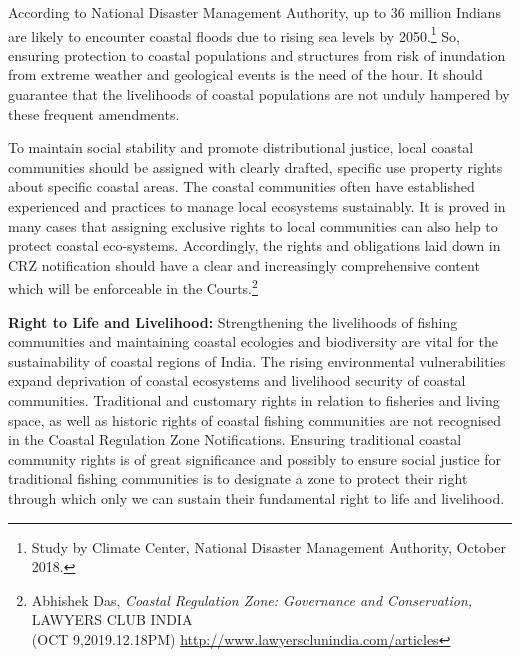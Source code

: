 \begin{multicols}{2}
\vspace{-.1cm}

\noi
According to National Disaster Management Authority, up to 36 million Indians are likely
to encounter coastal floods due to rising sea levels by 2050.\footnote{Study by Climate Center, National Disaster Management Authority, October 2018.} So, ensuring protection to
coastal populations and structures from risk of inundation from extreme weather and
geological events is the need of the hour. It should guarantee that the livelihoods of coastal
populations are not unduly hampered by these frequent amendments.

\noi
To maintain social stability and promote distributional justice, local coastal communities
should be assigned with clearly drafted, specific use property rights about specific coastal
areas. The coastal communities often have established experienced and practices to
manage local ecosystems sustainably. It is proved in many cases that assigning exclusive 
rights to local communities can also help to protect coastal eco-systems. Accordingly, the
rights and obligations laid down in CRZ notification should have a clear and increasingly
comprehensive content which will be enforceable in the Courts.\footnote{Abhishek Das, \textit{Coastal Regulation Zone: Governance and Conservation,} LAWYERS CLUB INDIA\\(OCT 9,2019.12.18PM) \url{http://www.lawyersclunindia.com/articles}}


\noi
{\large\bfseries Right to Life and Livelihood:} Strengthening the livelihoods of fishing
communities and maintaining coastal ecologies and biodiversity are vital for the
sustainability of coastal regions of India. The rising environmental vulnerabilities expand
deprivation of coastal ecosystems and livelihood security of coastal communities. Traditional
and customary rights in relation to fisheries and living space, as well as historic rights of
coastal fishing communities are not recognised in the Coastal Regulation Zone Notifications.
Ensuring traditional coastal community rights is of great significance and possibly to ensure
social justice for traditional fishing communities is to designate a zone to protect their right
through which only we can sustain their fundamental right to life and livelihood.


\end{multicols}
